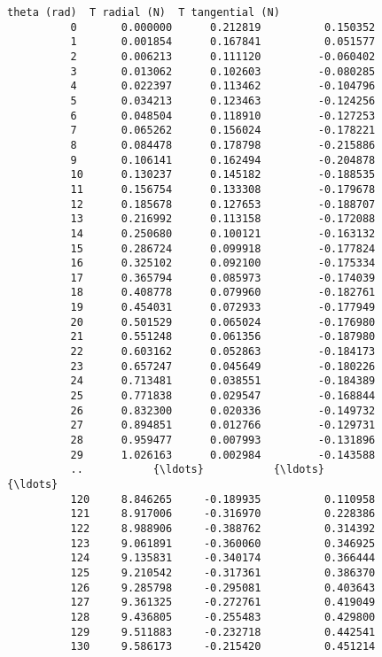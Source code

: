 \documentclass[11pt]{article}
\begin{document}
\begin{Verbatim}[commandchars=\\\{\}]
               theta (rad)  T radial (N)  T tangential (N)  
          0       0.000000      0.212819          0.150352  
          1       0.001854      0.167841          0.051577  
          2       0.006213      0.111120         -0.060402  
          3       0.013062      0.102603         -0.080285  
          4       0.022397      0.113462         -0.104796  
          5       0.034213      0.123463         -0.124256  
          6       0.048504      0.118910         -0.127253  
          7       0.065262      0.156024         -0.178221  
          8       0.084478      0.178798         -0.215886  
          9       0.106141      0.162494         -0.204878  
          10      0.130237      0.145182         -0.188535  
          11      0.156754      0.133308         -0.179678  
          12      0.185678      0.127653         -0.188707  
          13      0.216992      0.113158         -0.172088  
          14      0.250680      0.100121         -0.163132  
          15      0.286724      0.099918         -0.177824  
          16      0.325102      0.092100         -0.175334  
          17      0.365794      0.085973         -0.174039  
          18      0.408778      0.079960         -0.182761  
          19      0.454031      0.072933         -0.177949  
          20      0.501529      0.065024         -0.176980  
          21      0.551248      0.061356         -0.187980  
          22      0.603162      0.052863         -0.184173  
          23      0.657247      0.045649         -0.180226  
          24      0.713481      0.038551         -0.184389  
          25      0.771838      0.029547         -0.168844  
          26      0.832300      0.020336         -0.149732  
          27      0.894851      0.012766         -0.129731  
          28      0.959477      0.007993         -0.131896  
          29      1.026163      0.002984         -0.143588  
          ..           {\ldots}           {\ldots}               {\ldots}  
          120     8.846265     -0.189935          0.110958  
          121     8.917006     -0.316970          0.228386  
          122     8.988906     -0.388762          0.314392  
          123     9.061891     -0.360060          0.346925  
          124     9.135831     -0.340174          0.366444  
          125     9.210542     -0.317361          0.386370  
          126     9.285798     -0.295081          0.403643  
          127     9.361325     -0.272761          0.419049  
          128     9.436805     -0.255483          0.429800  
          129     9.511883     -0.232718          0.442541  
          130     9.586173     -0.215420          0.451214  

\end{Verbatim}
\end{document}
